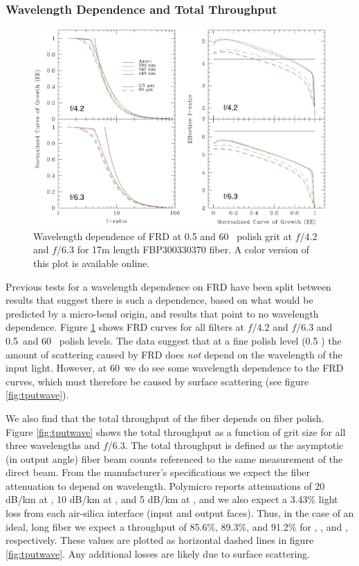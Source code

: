 \subsubsection{Wavelength Dependence and Total Throughput}
\label{sec:wavelength}
\begin{figure}[ht]
  \centering
  \includegraphics[width=\textwidth, trim=0 2.6in 0 0, clip=true]{FRD/figs/filters.eps}
  \caption{\label{fig:wave} Wavelength dependence of FRD at 0.5 and 60
   \mum\ polish grit at $f$/4.2 and $f$/6.3 for 17m length
    FBP300330370 fiber. A color version of this plot is available online.}
\end{figure}

Previous tests for a wavelength dependence on FRD have been split
between results that suggest there is such a
dependence\cite{Carrasco,Gloge72}, based on what would be predicted by
a micro-bend origin, and results that point to no wavelength
dependence\cite{Mab_04, Schmoll_03}. Figure \ref{fig:wave} shows FRD
curves for all filters at $f$/4.2 and $f$/6.3 and 0.5\mum\ and 60
\mum\ polish levels. The data suggest that at a fine polish level (0.5
\mum) the amount of scattering caused by FRD does {\it not} depend on
the wavelength of the input light. However, at 60\mum\ we do see some
wavelength dependence to the FRD curves, which  must therefore be
caused by surface scattering (see figure \ref{fig:tputwave}).

We also find that the total throughput of the fiber depends on
fiber polish. Figure \ref{fig:tputwave} shows the
total throughput as a function of grit size for all three wavelengths
and $f$/6.3. The total throughput is defined as the asymptotic (in output
 angle) fiber beam counts referenced to the same measurement of the direct
 beam. From the manufacturer's specifications
we expect the fiber attenuation to depend on wavelength. Polymicro
reports attenuations of 20 dB/km at \filtB, 10 dB/km at \filty, and 5
dB/km at \filtI, and we also expect a 3.43\% light loss from each
air-silica interface (input and output faces). Thus, in the case of an
ideal,  long fiber we expect a throughput of 85.6\%,
89.3\%, and 91.2\% for \filtB, \filty, and \filtI, respectively. These
values are plotted as horizontal dashed lines in figure
\ref{fig:tputwave}. Any additional losses are likely due to surface
scattering.

